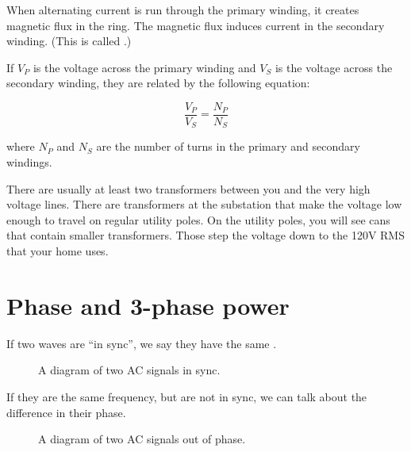 When alternating current is run through the primary winding, it creates magnetic
flux in the ring. The magnetic flux induces current in the secondary
winding. (This is called .)

If $V_P$ is the voltage across the primary winding and $V_S$ is the
voltage across the secondary winding, they are related by the
following equation:

$$\frac{V_P}{V_S} = \frac{N_P}{N_S}$$

where $N_P$ and $N_S$ are the number of turns in the primary and
secondary windings.

There are usually at least two transformers between you and the very
high voltage lines. There are transformers at the substation that make
the voltage low enough to travel on regular utility poles. On the
utility poles, you will see cans that contain smaller
transformers. Those step the voltage down to the 120V RMS that your home uses.

\section{Phase and 3-phase power}
If two waves are ``in sync'', we say they have the same .
\begin{figure}[htbp]
    \centering
    \caption{A diagram of two AC signals in sync.}
    \label{fig:ACsync}
\end{figure}

If they are the same frequency, but are not in sync, we can talk about
the difference in their phase.
\begin{figure}[htbp]
    \centering
    \caption{A diagram of two AC signals out of phase.}
    \label{fig:ACoutsync}
\end{figure}

